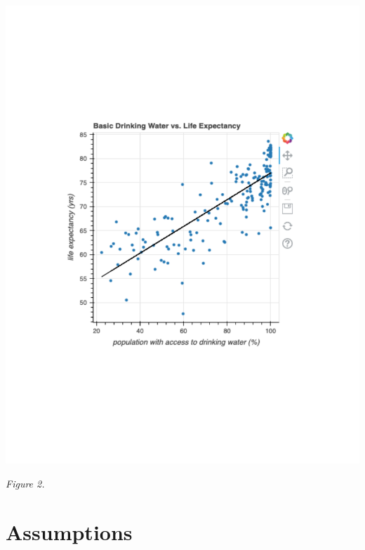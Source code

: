 \documentclass[12pt]{article}
\begin{document}
\begin{center}
\includegraphics[width=6in]{Manuscript/figure4.pdf}\\
\end{center}

\begin{center}
    \textit{Figure 2.}
\end{center}

\section*{Assumptions}
\end{document}

